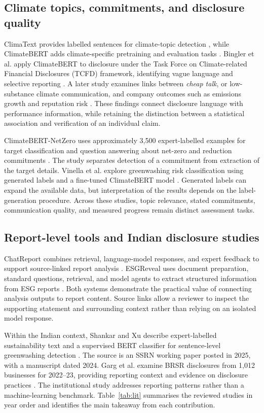 \subsection{Climate topics, commitments, and disclosure quality}

ClimaText provides labelled sentences for climate-topic detection \cite{varini2020}, while ClimateBERT adds climate-specific pretraining and evaluation tasks \cite{webersinke2021}. Bingler et al. apply ClimateBERT to disclosure under the Task Force on Climate-related Financial Disclosures (TCFD) framework, identifying vague language and selective reporting \cite{bingler2022}. A later study examines links between \emph{cheap talk}, or low-substance climate communication, and company outcomes such as emissions growth and reputation risk \cite{bingler2024}. These findings connect disclosure language with performance information, while retaining the distinction between a statistical association and verification of an individual claim.

ClimateBERT-NetZero uses approximately 3,500 expert-labelled examples for target classification and question answering about net-zero and reduction commitments \cite{schimanski2023}. The study separates detection of a commitment from extraction of the target details. Vinella et al. explore greenwashing risk classification using generated labels and a fine-tuned ClimateBERT model \cite{vinella2024}. Generated labels can expand the available data, but interpretation of the results depends on the label-generation procedure. Across these studies, topic relevance, stated commitments, communication quality, and measured progress remain distinct assessment tasks.

\subsection{Report-level tools and Indian disclosure studies}

ChatReport combines retrieval, language-model responses, and expert feedback to support source-linked report analysis \cite{ni2023}. ESGReveal uses document preparation, standard questions, retrieval, and model agents to extract structured information from ESG reports \cite{zou2025}. Both systems demonstrate the practical value of connecting analysis outputs to report content. Source links allow a reviewer to inspect the supporting statement and surrounding context rather than relying on an isolated model response.

Within the Indian context, Shankar and Xu describe expert-labelled sustainability text and a supervised BERT classifier for sentence-level greenwashing detection \cite{shankar2025}. The source is an SSRN working paper posted in 2025, with a manuscript dated 2024. Garg et al. examine BRSR disclosures from 1,012 businesses for 2022--23, providing reporting context and evidence on disclosure practices \cite{garg2025}. The institutional study addresses reporting patterns rather than a machine-learning benchmark. Table~\ref{tab:lit} summarises the reviewed studies in year order and identifies the main takeaway from each contribution.

